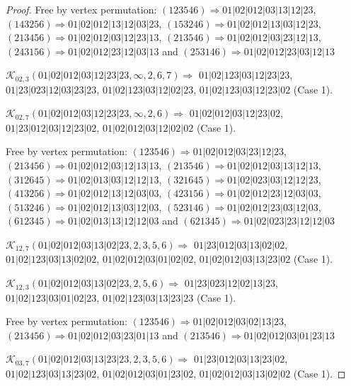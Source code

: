 \documentclass[12pt]{article}
\theoremstyle{plain}
\theoremstyle{definition}
\theoremstyle{remark}
\newcommand{\fancy}[1]{\mathcal{#1}}
\def\K{\fancy{K}}
\begin{document}
\begin{proof}
	
	
	Free by vertex permutation: $(1 2 3 5 4 6)\Rightarrow 01|02|012|03|13|12|23$, $(1 4 3 2 5 6)\Rightarrow 01|02|012|13|12|03|23$, $(1 5 3 2 4 6)\Rightarrow 01|02|012|13|03|12|23$, $(2 1 3 4 5 6)\Rightarrow 01|02|012|03|12|23|13$, $(2 1 3 5 4 6)\Rightarrow 01|02|012|03|23|12|13$, $(2 4 3 1 5 6)\Rightarrow 01|02|012|23|12|03|13$ and $(2 5 3 1 4 6)\Rightarrow 01|02|012|23|03|12|13$
	
	
	
	\bigskip
	
	$\K_{02,3}(01|02|012|03|12|23|23,\infty,2, 6, 7)\Rightarrow $ $01|02|123|03|12|23|23$, $01|23|023|12|03|23|23$, $01|02|123|03|12|02|23$, $01|02|123|03|12|23|02$ (Case 1).
	
	$\K_{02,7}(01|02|012|03|12|23|23,\infty,2, 6)\Rightarrow $ $01|02|012|03|12|23|02$, $01|23|012|03|12|23|02$, $01|02|012|03|12|02|02$ (Case 1).
	
	
	
	Free by vertex permutation: $(1 2 3 5 4 6)\Rightarrow 01|02|012|03|23|12|23$, $(2 1 3 4 5 6)\Rightarrow 01|02|012|03|12|13|13$, $(2 1 3 5 4 6)\Rightarrow 01|02|012|03|13|12|13$, $(3 1 2 6 4 5)\Rightarrow 01|02|013|03|12|12|13$, $(3 2 1 6 4 5)\Rightarrow 01|02|023|03|12|12|23$, $(4 1 3 2 5 6)\Rightarrow 01|02|012|13|12|03|03$, $(4 2 3 1 5 6)\Rightarrow 01|02|012|23|12|03|03$, $(5 1 3 2 4 6)\Rightarrow 01|02|012|13|03|12|03$, $(5 2 3 1 4 6)\Rightarrow 01|02|012|23|03|12|03$, $(6 1 2 3 4 5)\Rightarrow 01|02|013|13|12|12|03$ and $(6 2 1 3 4 5)\Rightarrow 01|02|023|23|12|12|03$
	
	
	
	\bigskip
	
	$\K_{12,7}(01|02|012|03|13|02|23,2, 3, 5, 6)\Rightarrow $ $01|23|012|03|13|02|02$, $01|02|123|03|13|02|02$, $01|02|012|03|01|02|02$, $01|02|012|03|13|23|02$ (Case 1).
	
	$\K_{12,3}(01|02|012|03|13|02|23,2, 5, 6)\Rightarrow $ $01|23|023|12|02|13|23$, $01|02|123|03|01|02|23$, $01|02|123|03|13|23|23$ (Case 1).
	
	
	
	Free by vertex permutation: $(1 2 3 5 4 6)\Rightarrow 01|02|012|03|02|13|23$, $(2 1 3 4 5 6)\Rightarrow 01|02|012|03|23|01|13$ and $(2 1 3 5 4 6)\Rightarrow 01|02|012|03|01|23|13$
	
	
	
	\bigskip
	
	$\K_{03,7}(01|02|012|03|13|23|23,2, 3, 5, 6)\Rightarrow $ $01|23|012|03|13|23|02$, $01|02|123|03|13|23|02$, $01|02|012|03|01|23|02$, $01|02|012|03|13|02|02$ (Case 1).
	

\end{proof}
\end{document}
